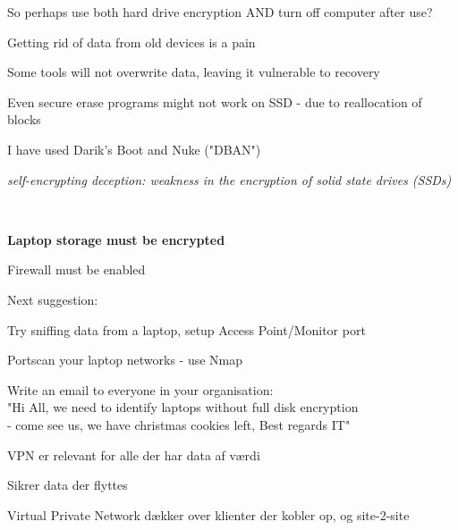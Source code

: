\documentclass[Screen16to9,17pt]{foils}
\begin{document}
\centerline{So perhaps use both hard drive encryption AND turn off computer after use?}



\begin{list1}
\item Getting rid of data from old devices is a pain
\item Some tools will not overwrite data, leaving it vulnerable to recovery
\item Even secure erase programs might not work on SSD - due to reallocation of blocks
\item I have used Darik's Boot and Nuke ("DBAN") 
\end{list1}



\emph{self-encrypting deception: weakness in the encryption of solid state drives (SSDs)}\\






{~}
\begin{list1}
\item {\bf Laptop storage must be encrypted}
\item Firewall must be enabled
\item Next suggestion:
\begin{list2}
\item Try sniffing data from a laptop, setup Access Point/Monitor port
\item Portscan your laptop networks - use Nmap
\item Write an email to everyone in your organisation:\\
"Hi All, we need to identify laptops without full disk encryption \\
- come see us, we have christmas cookies left, Best regards IT"
\end{list2}
\end{list1}



\begin{list2}
\item VPN er relevant for alle der har data af værdi
\item Sikrer data der flyttes
\item Virtual Private Network dækker over klienter der kobler op, og site-2-site
\end{list2}
\end{document}
